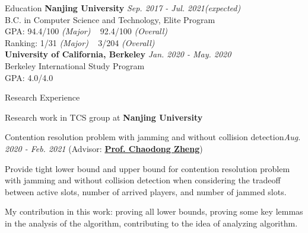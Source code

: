 \documentclass{resume} %
\begin{document}
\vspace{-2pt}
\begin{rSection}{Education}
{\bf Nanjing University} \hfill {\em Sep. 2017 - Jul. 2021(expected)} \\
B.C. in Computer Science and Technology, Elite Program \\
GPA: 94.4/100 {\em (Major)} ~ 92.4/100 {\em (Overall)}\\
Ranking: 1/31 {\em (Major)} ~ 3/204 {\em (Overall)}\smallskip\\
{\bf University of California, Berkeley} \hfill {\em Jan. 2020 - May. 2020} \\
Berkeley International Study Program
\smallskip\\
GPA: 4.0/4.0
\end{rSection}

\begin{rSection}{Research Experience}

{\large Research work in TCS group at {\bf Nanjing University} }

\begin{rSubsection}{Contention resolution problem with jamming and without collision detection}{\em Aug. 2020 - Feb. 2021}{ (Advisor: \href{https://chaodong.me/}{\bf Prof. Chaodong Zheng})}{}
\item Provide tight lower bound and upper bound for contention resolution problem with jamming and without collision detection when considering the tradeoff between active slots, number of arrived players, and number of jammed slots. 
\item My contribution in this work: proving all lower bounds, proving some key lemmas in the analysis of the algorithm, contributing to the idea of analyzing algorithm. 
\end{rSubsection}
\end{rSection}
\end{document}

